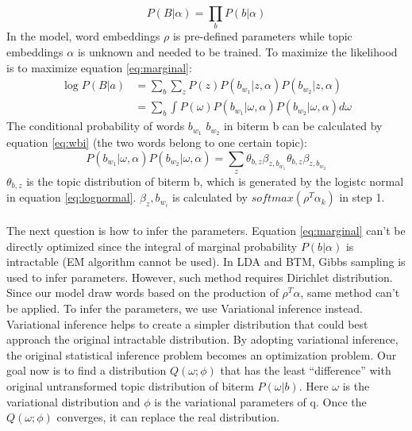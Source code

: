 \begin{equation}
    P(B|\alpha) = \prod_bP(b|\alpha)
    \label{eq:corpus}
\end{equation}
In the model, word embeddings $\rho$ is pre-defined parameters while topic embeddings $\alpha$ is unknown and needed to be trained.
To maximize the likelihood is to maximize equation \ref{eq:marginal}:
\begin{equation}
    \begin{aligned}
        \log P(B|a) & = \sum_{b}\sum_zP(z)P(b_{w_1}|z,\alpha)P(b_{w_2}|z,\alpha)\\
        & = \sum_{b}\int P(\omega)P(b_{w_1}|\omega,\alpha)P(b_{w_2}|\omega,\alpha)d\omega
    \end{aligned} 
    \label{eq:marginal}
\end{equation}
The conditional probability of words $b_{w_1}$ $b_{w_2}$ in biterm b can be calculated by equation \ref{eq:wbi} (the two words belong to one certain topic):
\begin{equation}
    P(b_{w_1}|\omega,\alpha)P(b_{w_2}|\omega,\alpha) = \sum_z \theta_{b,z}\beta_{z,b_{w_1}}\theta_{b,z}\beta_{z,b_{w_2}}
\label{eq:wbi}
\end{equation}
$\theta_{b,z}$ is the topic distribution of biterm b, which is generated by the logistc normal in equation \ref{eq:lognormal}. $\beta_z,b_{w_i}$ is calculated by $softmax(\rho^T\alpha_k)$ in step 1.
\\\\
The next question is how to infer the parameters. Equation \ref{eq:marginal} can't be directly optimized since the integral of marginal probability $P(b|\alpha)$ is intractable (EM algorithm cannot be used). In LDA and BTM, Gibbs sampling is used to infer parameters. However, such method requires Dirichlet distribution. Since our model draw words based on the production of $\rho^T\alpha$, same method can't be applied. To infer the parameters, we use Variational inference\cite{wainwright2008graphical} instead. Variational inference helps to create a simpler distribution that could best approach the original intractable distribution. By adopting variational inference, the original statistical inference problem becomes an optimization problem. Our goal now is to find a distribution $Q(\omega; \phi)$ that has the least ``difference'' with original untransformed topic distribution of biterm $P(\omega|b)$. Here $\omega$ is the variational distribution and $\phi$ is the variational parameters of q. Once the $Q(\omega; \phi)$ converges, it can replace the real distribution.
